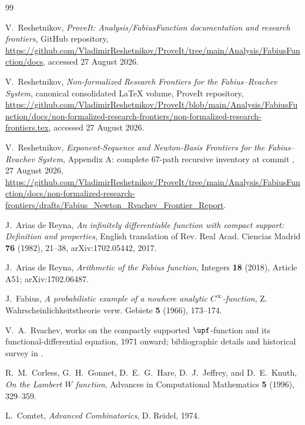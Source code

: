 \documentclass[11pt,oneside]{article}
\theoremstyle{definition}
\theoremstyle{remark}
\newcommand{\1}{\mathbf 1}
\begin{document}
\begin{thebibliography}{99}

V.~Reshetnikov,
\emph{ProveIt: Analysis/FabiusFunction documentation and research frontiers},
GitHub repository,
\url{https://github.com/VladimirReshetnikov/ProveIt/tree/main/Analysis/FabiusFunction/docs},
accessed 27 August 2026.

V.~Reshetnikov,
\emph{Non-formalized Research Frontiers for the Fabius--Rvachev System},
canonical consolidated LaTeX volume, ProveIt repository,
\url{https://github.com/VladimirReshetnikov/ProveIt/blob/main/Analysis/FabiusFunction/docs/non-formalized-research-frontiers/non-formalized-research-frontiers.tex},
accessed 27 August 2026.

V.~Reshetnikov,
\emph{Exponent-Sequence and Newton-Basis Frontiers for the Fabius--Rvachev System},
Appendix A: complete 67-path recursive inventory at commit
, 27 August 2026,
\url{https://github.com/VladimirReshetnikov/ProveIt/tree/main/Analysis/FabiusFunction/docs/non-formalized-research-frontiers/drafts/Fabius_Newton_Rvachev_Frontier_Report}.

J.~Arias de Reyna,
\emph{An infinitely differentiable function with compact support: Definition and
properties},
English translation of Rev. Real Acad. Ciencias Madrid \textbf{76} (1982), 21--38,
arXiv:1702.05442, 2017.

J.~Arias de Reyna,
\emph{Arithmetic of the Fabius function},
Integers \textbf{18} (2018), Article A51; arXiv:1702.06487.

J.~Fabius,
\emph{A probabilistic example of a nowhere analytic \(C^\infty\)-function},
Z. Wahrscheinlichkeitstheorie verw. Gebiete \textbf{5} (1966), 173--174.

V.~A.~Rvachev,
works on the compactly supported \(\upf\)-function and its functional-differential
equation, 1971 onward; bibliographic details and historical survey in
\cite{p10:Arias1982,p10:AriasArithmetic}.

R.~M.~Corless, G.~H.~Gonnet, D.~E.~G.~Hare, D.~J.~Jeffrey, and D.~E.~Knuth,
\emph{On the Lambert \(W\) function},
Advances in Computational Mathematics \textbf{5} (1996), 329--359.

L.~Comtet,
\emph{Advanced Combinatorics},
D. Reidel, 1974.


\end{thebibliography}
\end{document}
